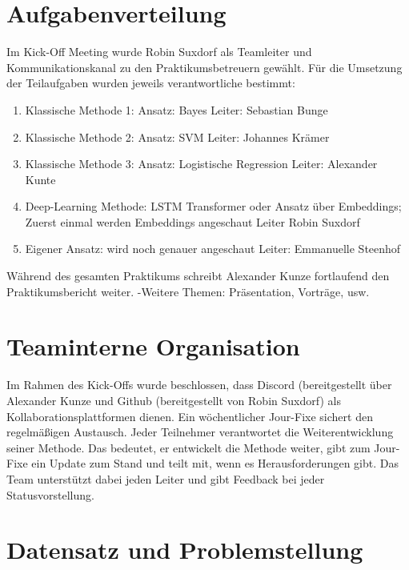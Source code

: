 \documentclass[researchlab,palatino]{AIGpaper}
\begin{document}
\section{Aufgabenverteilung}
Im Kick-Off Meeting wurde Robin Suxdorf als Teamleiter und Kommunikationskanal zu den Praktikumsbetreuern gewählt.  Für die Umsetzung der Teilaufgaben wurden jeweils verantwortliche bestimmt:
\begin{enumerate}
    \item Klassische Methode 1: Ansatz: Bayes Leiter: Sebastian Bunge
    \item Klassische Methode 2: Ansatz: SVM Leiter: Johannes Krämer
    \item Klassische Methode 3: Ansatz: Logistische Regression Leiter: Alexander Kunte
    \item Deep-Learning Methode: LSTM Transformer oder Ansatz über Embeddings; Zuerst einmal werden Embeddings angeschaut Leiter Robin Suxdorf
    \item Eigener Ansatz: wird noch genauer angeschaut Leiter: Emmanuelle Steenhof
\end{enumerate}
Während des gesamten Praktikums schreibt Alexander Kunze fortlaufend den Praktikumsbericht weiter.
-Weitere Themen: Präsentation, Vorträge, usw. 
\section{Teaminterne Organisation}
Im Rahmen des Kick-Offs wurde beschlossen, dass Discord (bereitgestellt über Alexander Kunze und Github (bereitgestellt von Robin Suxdorf) als Kollaborationsplattformen dienen. Ein wöchentlicher Jour-Fixe sichert den regelmäßigen Austausch. Jeder Teilnehmer verantwortet die Weiterentwicklung seiner Methode. Das bedeutet, er entwickelt die Methode weiter, gibt zum Jour-Fixe ein Update zum Stand und teilt mit, wenn es Herausforderungen gibt. Das Team unterstützt dabei jeden Leiter und gibt Feedback bei jeder Statusvorstellung. 

\section{Datensatz und Problemstellung}
\end{document}
